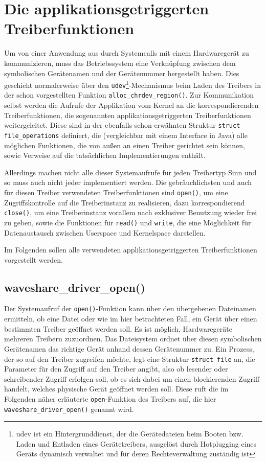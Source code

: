\section{Die applikationsgetriggerten Treiberfunktionen}
Um von einer Anwendung aus durch Systemcalls mit einem Hardwaregerät zu kommunizieren, muss das Betriebssystem eine Verknüpfung zwischen dem symbolischen Gerätenamen und der Gerätenummer hergestellt haben. Dies geschieht normalerweise über den \texttt{udev}\footnote{udev ist ein Hintergrunddienst, der die Gerätedateien beim Booten bzw. Laden und Entladen eines Gerätetreibers, ausgelöst durch Hotplugging eines Geräts dynamisch verwaltet und für deren Rechteverwaltung zuständig ist}-Mechanismus beim Laden des Treibers in der schon vorgestellten Funktion \texttt{alloc_chrdev_region()}. Zur Kommunikation selbst werden die Aufrufe der Applikation vom Kernel an die korrespondierenden Treiberfunktionen, die sogenannten applikationsgetriggerten Treiberfunktionen weitergeleitet. Diese sind in der ebenfalls schon erwähnten Struktur \texttt{struct file_operations} definiert, die (vergleichbar mit einem Interface in Java) alle möglichen Funktionen, die von außen an einen Treiber gerichtet sein können, sowie Verweise auf die tatsächlichen Implementierungen enthält. 

Allerdings machen nicht alle dieser Systemaufrufe für jeden Treibertyp Sinn und so muss auch nicht jeder implementiert werden. Die gebräuchlichsten und auch für diesen Treiber verwendeten Treiberfunktionen sind \texttt{open()}, um eine Zugriffskontrolle auf die Treiberinstanz zu realisieren, dazu korrespondierend \texttt{close()}, um eine Treiberinstanz vorallem nach exklusiver Benutzung wieder frei zu geben, sowie die Funktionen für \texttt{read()} und \texttt{write}, die eine Möglichkeit für Datenaustausch zwischen Userspace und Kernelspace darstellen. 

Im Folgenden sollen alle verwendeten applikationsgetriggerten Treiberfunktionen vorgestellt werden.


\subsection{waveshare\_driver\_open()}
Der Systemaufruf der \texttt{open()}-Funktion kann über den übergebenen Dateinamen ermitteln, ob eine Datei oder wie im hier betrachteten Fall, ein Gerät über einen bestimmten Treiber geöffnet werden soll. Es ist möglich, Hardwaregeräte mehreren Treibern zuzuordnen. Das Dateisystem ordnet über diesen symbolischen Gerätenamen das richtige Gerät anhand dessen Gerätenummer zu. %
Ein Prozess, der so auf den Treiber zugreifen möchte, legt eine Struktur \texttt{struct file} an, die Parameter für den Zugriff auf den Treiber angibt, also ob lesender oder schreibender Zugriff erfolgen soll, ob es sich dabei um einen blockierenden Zugriff handelt, welches physische Gerät geöffnet werden soll. Diese ruft die im Folgenden näher erläuterte \texttt{open}-Funktion des Treibers auf, die hier \texttt{waveshare_driver_open()} genannt wird. \newline


